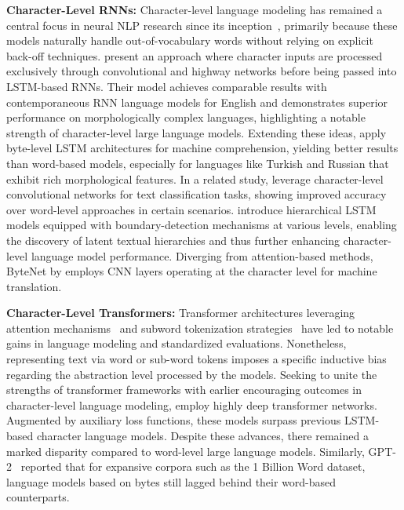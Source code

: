 \textbf{Character-Level RNNs:} Character-level language modeling has remained a central focus in neural NLP research since its inception~\citep{sutskever2011generating,mikolov2012subword,graves2013generating}, primarily because these models naturally handle out-of-vocabulary words without relying on explicit back-off techniques. \cite{kim2016character} present an approach where character inputs are processed exclusively through convolutional and highway networks before being passed into LSTM-based RNNs. Their model achieves comparable results with contemporaneous RNN language models for English and demonstrates superior performance on morphologically complex languages, highlighting a notable strength of character-level large language models. Extending these ideas, \cite{kenter2018byte} apply byte-level LSTM architectures for machine comprehension, yielding better results than word-based models, especially for languages like Turkish and Russian that exhibit rich morphological features. In a related study, \cite{zhang2015character} leverage character-level convolutional networks for text classification tasks, showing improved accuracy over word-level approaches in certain scenarios. \citet{chung2019hierarchical} introduce hierarchical LSTM models equipped with boundary-detection mechanisms at various levels, enabling the discovery of latent textual hierarchies and thus further enhancing character-level language model performance. Diverging from attention-based methods, ByteNet by \cite{kalchbrenner2016neural} employs CNN layers operating at the character level for machine translation.

\textbf{Character-Level Transformers:} Transformer architectures leveraging attention mechanisms~\citep{vaswani2017attention} and subword tokenization strategies~\citep{sennrich-etal-2016-neural} have led to notable gains in language modeling and standardized evaluations. Nonetheless, representing text via word or sub-word tokens imposes a specific inductive bias regarding the abstraction level processed by the models. Seeking to unite the strengths of transformer frameworks with earlier encouraging outcomes in character-level language modeling, \citet{al2019character} employ highly deep transformer networks. Augmented by auxiliary loss functions, these models surpass previous LSTM-based character language models. Despite these advances, there remained a marked disparity compared to word-level large language models. Similarly, GPT-2~\citep{radfordgpt2} reported that for expansive corpora such as the 1 Billion Word dataset, language models based on bytes still lagged behind their word-based counterparts.

